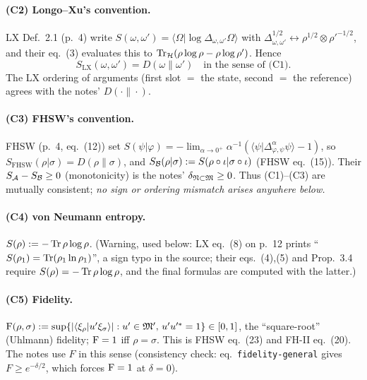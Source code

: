 \documentclass[11pt]{article}
\newcommand{\loc}[1]{{\small\texttt{#1}}}
\newcommand{\1}{\mathbf 1}
\begin{document}
\paragraph{(C2) Longo--Xu's convention.}
LX Def.~2.1 (p.~4) write $S(\omega,\omega')=\langle\Omega|\log\Delta_{\omega,\omega'}\Omega\rangle$
with $\Delta^{1/2}_{\omega,\omega'}\leftrightarrow\rho^{1/2}\otimes\rho'^{-1/2}$, and their eq.~(3) evaluates this to
$\operatorname{Tr}_{\mathcal H}(\rho\log\rho-\rho\log\rho')$. Hence
\begin{equation}\label{eq:convLX}
 S_{\mathrm{LX}}(\omega,\omega')=D(\omega\|\omega')\quad\text{in the sense of (C1).}
\end{equation}
The LX ordering of arguments (first slot $=$ the state, second $=$ the reference) agrees with the notes' $D(\cdot\|\cdot)$.

\paragraph{(C3) FHSW's convention.}
FHSW (p.~4, eq.~(12)) set $S(\psi|\varphi)=-\lim_{\alpha\to0^+}\alpha^{-1}(\langle\psi|\Delta^\alpha_{\varphi,\psi}\psi\rangle-1)$,
so $S_{\mathrm{FHSW}}(\rho|\sigma)=D(\rho\|\sigma)$, and $S_{\mathcal B}(\rho|\sigma):=S(\rho\circ\iota|\sigma\circ\iota)$
(FHSW eq.~(15)). Their $S_{\mathcal A}-S_{\mathcal B}\ge0$ (monotonicity) is the notes' $\delta_{\mathfrak N\subset\mathfrak M}\ge0$.
Thus (C1)--(C3) are mutually consistent; \emph{no sign or ordering mismatch arises anywhere below.}

\paragraph{(C4) von Neumann entropy.}
$S(\rho):=-\operatorname{Tr}\rho\log\rho$. (Warning, used below: LX eq.~(8) on p.~12 prints
``$S(\rho_1)=\operatorname{Tr}(\rho_1\ln\rho_1)$'', a sign typo in the source; their eqs.~(4),(5) and Prop.~3.4
require $S(\rho)=-\operatorname{Tr}\rho\log\rho$, and the final formulas are computed with the latter.)

\paragraph{(C5) Fidelity.}
$\operatorname{F}(\rho,\sigma):=\sup\{|\langle\xi_\rho|u'\xi_\sigma\rangle| : u'\in\mathfrak M',\,u'u'^*=1\}\in[0,1]$,
the ``square-root'' (Uhlmann) fidelity; $\operatorname{F}=1$ iff $\rho=\sigma$. This is FHSW eq.~(23) and
FH-II eq.~(20). The notes use $F$ in this sense (consistency check: eq.~\loc{fidelity-general}
gives $F\ge e^{-\delta/2}$, which forces $\operatorname{F}=1$ at $\delta=0$).
\end{document}
